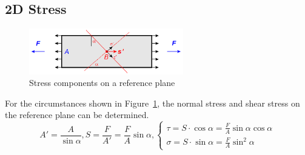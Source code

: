 \documentclass[en,hazy,cyan,8pt,normal]{elegantnote}
\begin{document}
  \subsection{2D Stress}
    \begin{figure}[H]
      \centering
      \includegraphics[width=0.6\textwidth]{image/001.png}
      \caption{Stress components on a reference plane}
      \label{fig:001}
    \end{figure}
    For the circumstances shown in Figure~\ref{fig:001}, the normal stress and shear stress on the reference plane can be determined.
    \begin{equation}\label{eq:002}
      A'=\frac{A}{\sin \alpha}, S=\frac{F}{A'}=\frac{F}{A} \sin \alpha,
      \begin{cases}
        \tau=S\cdot\cos\alpha=\frac{F}{A} \sin \alpha \cos \alpha\\
        \sigma=S\cdot\sin\alpha=\frac{F}{A} \sin^2 \alpha
      \end{cases}
    \end{equation}
\end{document}
